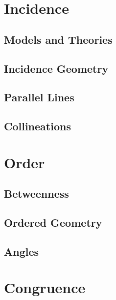 \documentclass{memoir}
\begin{document}
\mainmatter

\chapter{Incidence}
\newpage

  \section{Models and Theories}
    
    \newpage

  \section{Incidence Geometry}
    
    \newpage

  \section{Parallel Lines}
    
    \newpage

  \section{Collineations}
    


\chapter{Order}
\newpage

  \section{Betweenness}
    
    \newpage

  \section{Ordered Geometry}
    
    \newpage

  \section{Angles}
    


\chapter{Congruence}
\newpage
\end{document}
